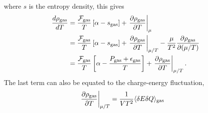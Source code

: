 \documentclass[12pt]{article}
\numberwithin{equation}{section}
\numberwithin{figure}{section}
\begin{document}
where $s$ is the entropy density, this gives
\begin{align*}
\frac{d\rho_{\rm gas}}{dT}&=\frac{\mathcal{F}_{\rm gas}}{T}\left[\alpha-s_{\rm gas}\right]+\left.\frac{\partial\rho_{\rm gas}}{\partial T}\right|_\mu\\
&=\frac{\mathcal{F}_{\rm gas}}{T}\left[\alpha-s_{\rm gas}\right]
+\left.\frac{\partial\rho_{\rm gas}}{\partial T}\right|_{\mu/T}
-\frac{\mu}{T^2}\frac{\partial\rho_{\rm gas}}{\partial (\mu/T)}\\
&=\frac{\mathcal{F}_{\rm gas}}{T}\left[\alpha-\frac{P_{\rm gas}+\epsilon_{\rm gas}}{T}\right]
+\left.\frac{\partial\rho_{\rm gas}}{\partial T}\right|_{\mu/T}.
\end{align*}
The last term can also be equated to the charge-energy fluctuation,
\begin{align*}
\left.\frac{\partial\rho_{\rm gas}}{\partial T}\right|_{\mu/T}&=\frac{1}{VT^2}\langle\delta E\delta Q\rangle_{\rm gas}
\end{align*}

\begin{comment}
Some rearranging,
\begin{align*}
\alpha-s_{\rm gas}&=\frac{s_{\rm gas}\rho_{\rm lig}-s_{\rm lig}\rho_{\rm gas}}{\rho_{\rm liq}-\rho_{\rm gas}}-s_{\rm gas}\\
&=\frac{s_{\rm gas}\rho_{\rm lig}-s_{\rm lig}\rho_{\rm liq}}{\rho_{\rm liq}-\rho_{\rm gas}}
-\frac{s_{\rm gas}(\rho_{\rm liq}-\rho_{\rm gas})}{\rho_{\rm liq}-\rho_{\rm gas}}\\
&=\frac{s_{\rm gas}\rho_{\rm gas}-s_{\rm liq}\rho_{\rm gas}}{\rho_{\rm liq}-\rho_{\rm gas}}\\
&=\frac{s_{\rm gas}-s_{\rm liq}}{\rho_{\rm liq}-\rho_{\rm gas}}\rho_{\rm gas}.
\end{align*}
The result is:
\begin{align*}
\frac{d\rho_{\rm gas}}{dT}&=\frac{\mathcal{F}_{\rm gas}}{T}\frac{(s_{\rm gas}-s_{\rm liq})}{(\rho_{\rm liq}-\rho_{\rm gas})}\rho_{\rm gas} +\left.\frac{\partial\rho_{\rm gas}}{\partial T}\right|_\mu.
\end{align*}
\end{comment}
\end{document}
